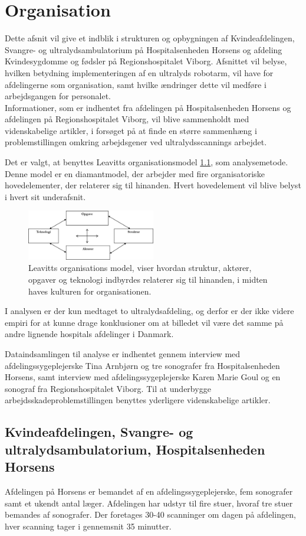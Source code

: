 \chapter{Organisation}
Dette afsnit vil give et indblik i strukturen og opbygningen af Kvindeafdelingen, Svangre- og ultralydsambulatorium på Hospitalsenheden Horsens og afdeling Kvindesygdomme og fødsler på Regionshospitalet Viborg. Afsnittet vil belyse, hvilken betydning implementeringen af en ultralyds robotarm, vil have for afdelingerne som organisation, samt hvilke ændringer dette vil medføre i arbejdsgangen for personalet. \\
Informationer, som er indhentet fra afdelingen på Hospitalsenheden Horsens og afdelingen på Regionshospitalet Viborg, vil blive sammenholdt med videnskabelige artikler, i forsøget på at finde en større sammenhæng i problemstillingen omkring arbejdsgener ved ultralydsscannings arbejdet.

Det er valgt, at benyttes Leavitts organisationsmodel \ref{LeavittModel}, som analysemetode. Denne model er en diamantmodel, der arbejder med fire organisatoriske hovedelementer, der relaterer sig til hinanden. Hvert hovedelement vil blive belyst i hvert sit underafsnit.

\begin{figure}[h!]\centering
	\includegraphics[width = 0.5\textwidth]{Figurer/LeavittModel}
	\caption{Leavitts organisations model, viser hvordan struktur, aktører, opgaver og teknologi indbyrdes relaterer sig til hinanden, i midten haves kulturen for organisationen.}
	\label{LeavittModel}
\end{figure}
I analysen er der kun medtaget to ultralydsafdeling, og derfor er der ikke videre empiri for at kunne drage konklusioner om at billedet vil være det samme på andre lignende hospitals afdelinger i Danmark. 

Dataindsamlingen til analyse er indhentet gennem interview med afdelingssygeplejerske Tina Arnbjørn og tre sonografer fra Hospitalsenheden Horsens, samt interview med afdelingssygeplejerske Karen Marie Goul og en sonograf fra Regionshospitalet Viborg.
Til at underbygge arbejdsskadeproblemstillingen benyttes yderligere videnskabelige artikler.

\section{Kvindeafdelingen, Svangre- og ultralydsambulatorium, Hospitalsenheden Horsens}
Afdelingen på Horsens er bemandet af en afdelingssygeplejerske, fem sonografer samt et ukendt antal læger. Afdelingen har udstyr til fire stuer, hvoraf tre stuer bemandes af sonografer. Der foretages 30-40 scanninger om dagen på afdelingen, hver scanning tager i gennemsnit 35 minutter.

